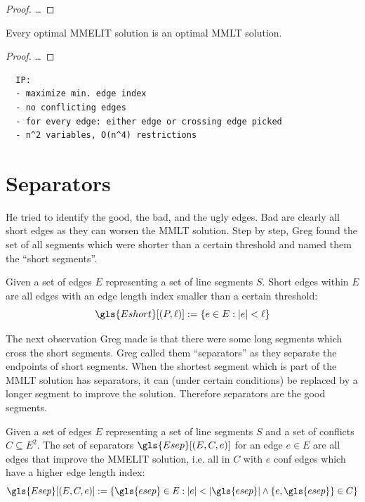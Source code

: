 \begin{proof}
  \ldots{}
\end{proof}

\begin{theorem}
  Every optimal \gls{MMELIT} solution is an optimal \gls{MMLT} solution.
\end{theorem}

\begin{proof}
  \ldots{}
\end{proof}

\begin{verbatim}
  IP:
  - maximize min. edge index
  - no conflicting edges
  - for every edge: either edge or crossing edge picked
  - n^2 variables, O(n^4) restrictions
\end{verbatim}

\section{Separators}
He tried to identify the good, the bad, and the ugly edges. Bad are
clearly all short edges as they can worsen the \gls{MMLT} solution.
Step by step, Greg found the set of all segments which were
shorter than a certain threshold and named them the
``short segments''.

\begin{definition}\label{def:short_edges}
  Given a set of edges \(E\) representing a set of line segments
  \(S\). Short edges within \(E\) are all edges with an edge
  length index smaller than a certain threshold:
  \[
    \gls{Eshort}[(P, \ell)] := \{ e \in E : |e| < \ell \}
  \]
\end{definition}

The next observation Greg made is that there were some long segments
which cross the short segments. Greg called them ``separators'' as
they separate the endpoints of short segments. When the shortest
segment which is part of the \gls{MMLT} solution has separators, it
can (under certain conditions) be replaced by a longer segment to
improve the solution. Therefore separators are the good segments.

\begin{definition}[Separators]\label{def:separators}
  Given a set of edges \(E\) representing a set of line segments
  \(S\) and a set of conflicts \(C \subseteq E^2\). The set of separators
  \(\gls{Esep}[(E, C, e)]\) for an edge \(e \in E\) are all edges
  that improve the \gls{MMELIT} solution, i.e. all in \(C\) with
  \(e\) \gls{conf} edges which have a higher edge length index:
  \[
	  \gls{Esep}[(E,C,e)] := \{
		  \gls{esep} \in E:
		  |e| < |\gls{esep}|\land \{e,\gls{esep}\} \in C
	  \}
  \]
\end{definition}

